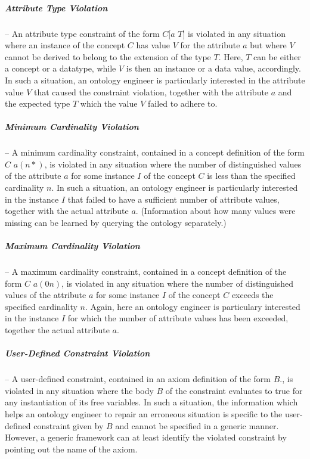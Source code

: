 \subparagraph{Attribute Type Violation} -- An attribute type
constraint of the form $C[a$  $T]$ is violated in any
situation where an instance of the concept $C$ has value $V$ for
the attribute $a$ but where $V$ cannot be derived to belong to the
extension of the type $T$. Here, $T$ can be either a concept or a
datatype, while $V$ is then an instance or a data value,
accordingly. In such a situation, an ontology engineer is
particularly interested in the attribute value $V$ that caused the
constraint violation, together with the attribute $a$ and the
expected type $T$ which the value $V$ failed to adhere to.

\subparagraph{Minimum Cardinality Violation} -- A minimum
cardinality constraint, contained in a concept definition of the
form  $C$ $a (n *)$, is violated in any situation
where the number of distinguished values of the attribute $a$ for
some instance $I$ of the concept $C$ is less than the specified
cardinality $n$. In such a situation, an ontology engineer is
particularly interested in the instance $I$ that failed to have a
sufficient number of attribute values, together with the actual
attribute $a$. (Information about how many values were missing can
be learned by querying the ontology separately.)

\subparagraph{Maximum Cardinality Violation} -- A maximum
cardinality constraint, contained in a concept definition of the
form  $C$ $a (0 n)$, is violated in any situation
where the number of distinguished values of the attribute $a$ for
some instance $I$ of the concept $C$ exceeds the specified
cardinality $n$. Again, here an ontology engineer is particulary
interested in the instance $I$ for which the number of attribute
values has been exceeded, together the actual attribute $a$.

\subparagraph{User-Defined Constraint Violation} -- A user-defined
constraint, contained in an axiom definition of the form
 \axiomid {} $B.$, is violated in any
situation where the body $B$ of the constraint evaluates to true
for any instantiation of its free variables. In such a situation,
the information which helps an ontology engineer to repair an
erroneous situation is specific to the user-defined constraint
given by $B$ and cannot be specified in a generic manner. However,
a generic framework can at least identify the violated constraint
by pointing out the name \axiomid of the axiom.

